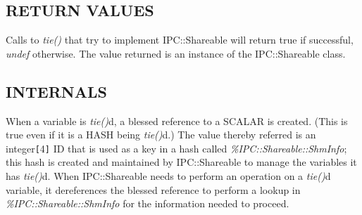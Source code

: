 \subsection*{RETURN VALUES}%

Calls to {\em tie()\/} that try to implement IPC::Shareable will return true
if successful, {\em undef\/} otherwise.  The value returned is an instance
of the IPC::Shareable class.

\subsection*{INTERNALS}%

When a variable is {\em tie()\/}d, a blessed reference to a SCALAR is created.
(This is true even if it is a HASH being {\em tie()\/}d.)  The value thereby
referred is an integer{\tt [}4{\tt ]} ID that is used as a key in a hash called
{\em \%IPC::Shareable::Shm\underscore{}Info\/}; this hash is created and maintained by
IPC::Shareable to manage the variables it has {\em tie()\/}d.  When
IPC::Shareable needs to perform an operation on a {\em tie()\/}d variable, it
dereferences the blessed reference to perform a lookup in
{\em \%IPC::Shareable::Shm\underscore{}Info\/} for the information needed to proceed.


